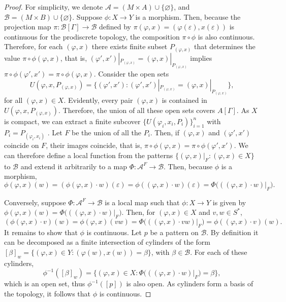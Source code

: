 \documentclass{article}
\theoremstyle{definition}
\theoremstyle{definition}
\begin{document}
\begin{proof}
For simplicity, we denote $\mathcal{A} = (M\times A)\cup \{\varnothing\}$, and $\mathcal{B} = (M\times B)\cup \{\varnothing\}$. Suppose $\phi\colon X\to Y$ is a morphism. Then, because the projection map $\pi:\mathcal{B}[\Gamma]\to \mathcal{B}$ defined by $\pi(\varphi, x) = (\varphi(\varepsilon), x(\varepsilon))$ is continuous for the prodiscrete topology, the composition $\pi\circ\phi$ is also continuous. Therefore, for each $(\varphi,x)$ there exists finite subset $P_{(\varphi,x)}$ that determines the value $\pi\circ\phi(\varphi,x)$, that is, $(\varphi',x')|_{P_{(\varphi,x)}} = (\varphi,x)|_{P_{(\varphi,x)}}$ implies $\pi\circ\phi(\varphi',x') = \pi\circ\phi(\varphi,x)$. Consider the open sets
\[U(\varphi,x, P_{(\varphi,x)}) = \{(\varphi',x') : (\varphi', x')|_{P_{(\varphi,x)}} = (\varphi,x)|_{P_{(\varphi,x)}}\},\]
for all $(\varphi,x)\in X$. Evidently, every pair $(\varphi, x)$ is contained in $U(\varphi,x,P_{(\varphi,x)})$. Therefore, the union of all these open sets covers $A[\Gamma]$. As $X$ is compact, we can extract a finite subcover $\{U(\varphi_i, x_i, P_i)\}_{i=1}^n$ with $P_i = P_{(\varphi_i,x_i)}$ . Let $F$ be the union of all the $P_i$. Then, if $(\varphi, x)$ and $(\varphi', x')$ coincide on $F$, their images coincide, that is, $\pi\circ\phi(\varphi, x) = \pi\circ\phi(\varphi',x')$. We can therefore define a local function from the patterns $\{(\varphi, x)|_F : (\varphi, x)\in X\}$ to $\mathcal{B}$ and extend it arbitrarily to a map $\Phi\colon \mathcal{A}^F\to \mathcal{B}$. Then, because $\phi$ is a morphism,
\[\phi(\varphi, x)(w) = (\phi(\varphi, x)\cdot w)(\varepsilon) = \phi((\varphi, x)\cdot w)(\varepsilon) = \Phi\bigl(((\varphi, x)\cdot w)|_{F}\bigr).\]

Conversely, suppose $\Phi\colon\mathcal{A}^{F}\to\mathcal{B}$ is a local map such that $\phi\colon X\to Y$ is given by $\phi(\varphi, x)(w) = \Phi\bigl(((\varphi, x)\cdot w)|_{F}\bigr)$. Then, for $(\varphi, x)\in X$ and $v,w\in S^*$, 
$$(\phi(\varphi, x)\cdot v)(w) = \phi(\varphi,x)(vw) = \Phi\bigl(((\varphi,x)\cdot vw)|_{F}\bigr) = \phi((\varphi,x)\cdot v)(w).$$
It remains to show that $\phi$ is continuous. Let $p$ be a pattern on $\mathcal{B}$. By definition it can be decomposed as a finite intersection of cylinders of the form $[\beta]_w = \{(\varphi,x)\in Y : (\varphi(w),x(w))=\beta\}$, with $\beta\in \mathcal{B}$. For each of these cylinders,
$$\phi^{-1}([\beta]_w) = \{(\varphi, x)\in X : \Phi\bigl(((\varphi, x)\cdot w)|_F\bigr) = \beta\},$$
which is an open set, thus $\phi^{-1}([p])$ is also open. As cylinders form a basis of the topology, it follows that $\phi$ is continuous.
\end{proof}
\end{document}
